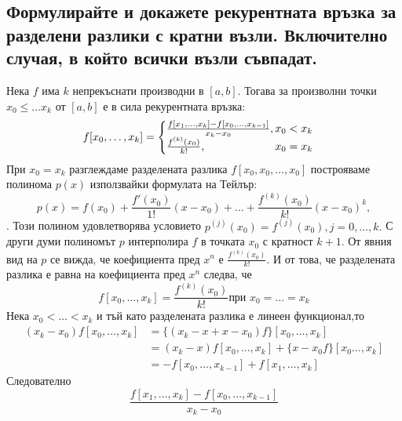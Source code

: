 \documentclass[12pt]{article}
\numberwithin{equation}{subsection}
\numberwithin{theorem}{subsection}
\numberwithin{definition}{subsection}
\numberwithin{corollary}{subsection}
\begin{document}
\subsection{Формулирайте и докажете рекурентната връзка за разделени разлики с кратни възли. Включително случая, в който всички възли съвпадат.}
\theorem
  Нека $f$ има $k$ непрекъснати производни в $[a,b]$. Тогава за произволни точки $x_0\leq\ldots x_k$ от $[a,b]$ е в сила рекурентната връзка:
  \begin{equation}\label{reqHerm}
    f[x_0,\ldots,x_k] = \begin{cases}
                          \frac{f[x_1,\ldots,x_k]-f[x_0,\ldots,x_{k-1}]}{x_k-x_0}, \hfill x_0<x_k\\
                          \frac{f^{(k)}(x_0)}{k!}, \hfill x_0=x_k
                        \end{cases}
  \end{equation}
\proof
  При $x_0=x_k$ разглеждаме разделената разлика $f[x_0,x_0,\ldots,x_0]$ построяваме полинома $p(x)$ използвайки формулата на Тейлър:
  \begin{equation*}
    p(x) = f(x_0)+\frac{f'(x_0)}{1!}(x-x_0)+\ldots+\frac{f^{(k)}(x_0)}{k!}(x-x_0)^k,
  \end{equation*}.
  Този полином удовлетворява условието $p^(j)(x_0)=f^{(j)}(x_0), j=0,\ldots,k.$
  С други думи полиномът $p$ интерполира $f$ в точката $x_0$ с кратност $k+1$. От явния вид на $p$ се вижда, че коефициента пред $x^n$ е $\frac{f^{(k)}(x_0)}{k!}$. И от това, че разделената разлика е равна на коефициента пред $x^n$ следва, че 
  \begin{equation*}
    f[x_0,\ldots,x_k]=\frac{f^{(k)}(x_0)}{k!} \text{при } x_0=\ldots=x_k
  \end{equation*}
  Нека $x_0<\ldots<x_k$ и тъй като разделената разлика е линеен функционал,то
  \begin{align*}
    (x_k-x_0)f[x_0,\ldots,x_k]&=\{(x_k-x+x-x_0)f\}[x_0,\ldots,x_k]\\
    &=(x_k-x)f[x_0,\ldots,x_k]+\{x-x_0f\}[x_0\ldots,x_k]\\
    &=-f[x_0,\ldots,x_{k-1}]+f[x_1,\ldots,x_k]
  \end{align*}
  Следователно
  \begin{equation*}
    \frac{f[x_1,\ldots,x_k]-f[x_0,\ldots,x_{k-1}]}{x_k-x_0}
  \end{equation*}
\end{document}
